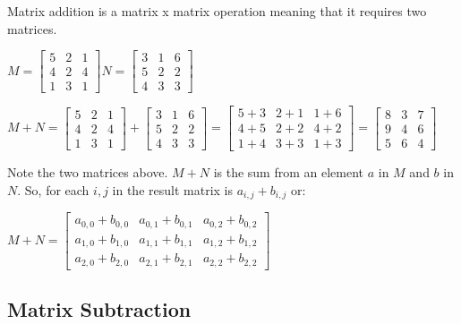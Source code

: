 \documentclass[12pt]{article}
\begin{document}
Matrix addition is a matrix x matrix operation meaning that it requires two matrices.
\begin{center}
$M = \begin{bmatrix} 5 & 2 & 1 \\ 4 & 2 & 4 \\ 1 & 3 & 1 \end{bmatrix}
  N = \begin{bmatrix} 3 & 1 & 6 \\ 5 & 2 & 2 \\ 4 & 3 & 3 \end{bmatrix}
$
\end{center}
\begin{center}
$M + N =
 \begin{bmatrix} 5 & 2 & 1 \\ 4 & 2 & 4 \\ 1 & 3 & 1 \end{bmatrix}  +
  \begin{bmatrix} 3 & 1 & 6 \\  5 & 2 & 2 \\ 4 & 3 & 3 \end{bmatrix} = 
  \begin{bmatrix} 5 + 3 & 2 + 1 & 1 + 6 \\ 4 + 5 & 2 + 2 & 4 + 2 \\ 1 + 4 & 3 + 3 & 1 + 3 \end{bmatrix} =
  \begin{bmatrix} 8 & 3 & 7 \\ 9 & 4 & 6 \\ 5 & 6 & 4 \end{bmatrix}
$
\end{center}
Note the two matrices above. $M + N$ is the sum from an element $a$ in $M$ and $b$ in $N$. So, for each $i, j$ in the result matrix is $a_{i,j} + b_{i,j}$ or:

\begin{center}
$M + N =
 \begin{bmatrix} a_{0, 0} + b_{0, 0} & a_{0, 1} + b_{0, 1} & a_{0, 2} + b_{0, 2} \\
 		         a_{1, 0} + b_{1, 0} & a_{1, 1} + b_{1, 1} & a_{1, 2} + b_{1, 2} \\
		         a_{2, 0} + b_{2, 0} & a_{2, 1} + b_{2, 1} & a_{2, 2} + b_{2, 2}
 \end{bmatrix}
$
\end{center}

\subsection{Matrix Subtraction}
\end{document}

